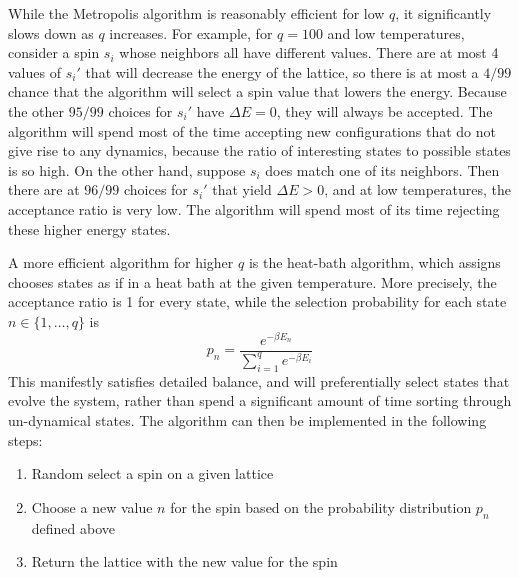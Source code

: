 \documentclass[twocolumn,aps,prl]{revtex4-1} %
\begin{document}
While the Metropolis algorithm is reasonably efficient for low $q$, it significantly slows down as $q$ increases. For example, for $q = 100$ and low temperatures, consider a spin $s_i$ whose neighbors all have different values. There are at most 4 values of $s_i'$ that will decrease the energy of the lattice, so there is at most a $4/99$ chance that the algorithm will select a spin value that lowers the energy. Because the other $95/99$ choices for $s_i'$ have $\Delta E = 0$, they will always be accepted. The algorithm will spend most of the time accepting new configurations that do not give rise to any dynamics, because the ratio of interesting states to possible states is so high. On the other hand, suppose $s_i$ does match one of its neighbors. Then there are at $96/99$ choices for $s_i'$ that yield $\Delta E > 0$, and at low temperatures, the acceptance ratio is very low. The algorithm will spend most of its time rejecting these higher energy states. 

A more efficient algorithm for higher $q$ is the heat-bath algorithm, which assigns chooses states as if in a heat bath at the given temperature. More precisely, the acceptance ratio is 1 for every state, while the selection probability for each state $n \in \{1,\ldots,q\}$ is
\begin{equation}
	p_n = \frac{e^{-\beta E_n}}{\sum_{i=1}^q e^{-\beta E_i}}
\end{equation}
This manifestly satisfies detailed balance, and will preferentially select states that evolve the system, rather than spend a significant amount of time sorting through un-dynamical states. The algorithm can then be implemented in the following steps:
\begin{enumerate}
	\item Random select a spin on a given lattice
	\item Choose a new value $n$ for the spin based on the probability distribution $p_n$ defined above
	\item Return the lattice with the new value for the spin
\end{enumerate}
\end{document}
